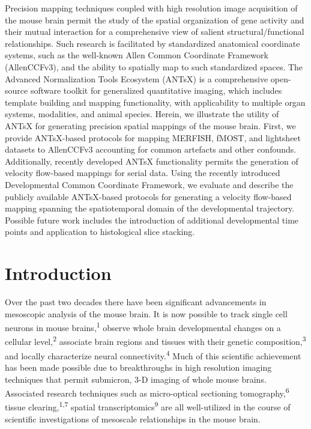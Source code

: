 \documentclass[
  12pt,
]{article}
\begin{document}
Precision mapping techniques coupled with high resolution image
acquisition of the mouse brain permit the study of the spatial
organization of gene activity and their mutual interaction for a
comprehensive view of salient structural/functional relationships. Such
research is facilitated by standardized anatomical coordinate systems,
such as the well-known Allen Common Coordinate Framework (AllenCCFv3),
and the ability to spatially map to such standardized spaces. The
Advanced Normalization Tools Ecosystem (ANTsX) is a comprehensive
open-source software toolkit for generalized quantitative imaging, which
includes template building and mapping functionality, with applicability
to multiple organ systems, modalities, and animal species. Herein, we
illustrate the utility of ANTsX for generating precision spatial
mappings of the mouse brain. First, we provide ANTsX-based protocols for
mapping MERFISH, fMOST, and lightsheet datasets to AllenCCFv3 accounting
for common artefacts and other confounds. Additionally, recently
developed ANTsX functionality permits the generation of velocity
flow-based mappings for serial data. Using the recently introduced
Developmental Common Coordinate Framework, we evaluate and describe the
publicly available ANTsX-based protocols for generating a velocity
flow-based mapping spanning the spatiotemporal domain of the
developmental trajectory. Possible future work includes the introduction
of additional developmental time points and application to histological
slice stacking.

\clearpage

\hypertarget{introduction}{%
\section*{Introduction}\label{introduction}}

Over the past two decades there have been significant advancements in
mesoscopic analysis of the mouse brain. It is now possible to track
single cell neurons in mouse brains,\textsuperscript{1} observe whole
brain developmental changes on a cellular level,\textsuperscript{2}
associate brain regions and tissues with their genetic
composition,\textsuperscript{3} and locally characterize neural
connectivity.\textsuperscript{4} Much of this scientific achievement has
been made possible due to breakthroughs in high resolution imaging
techniques that permit submicron, 3-D imaging of whole mouse brains.
Associated research techniques such as micro-optical sectioning
tomography,\textsuperscript{6} tissue clearing,\textsuperscript{1,7}
spatial transcriptomics\textsuperscript{9} are all well-utilized in the
course of scientific investigations of mesoscale relationships in the
mouse brain.
\end{document}
